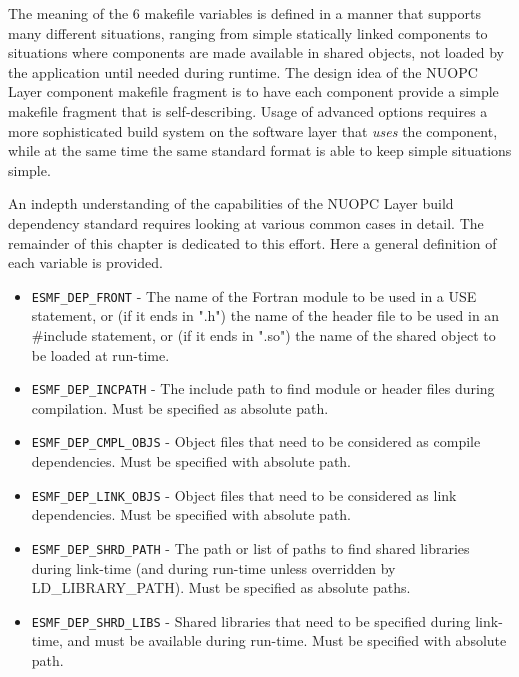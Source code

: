 The meaning of the 6 makefile variables is defined in a manner that supports many different situations, ranging from simple statically linked components to situations where components are made available in shared objects, not loaded by the application until needed during runtime. The design idea of the NUOPC Layer component makefile fragment is to have each component provide a simple makefile fragment that is self-describing. Usage of advanced options requires a more sophisticated build system on the software layer that {\em uses} the component, while at the same time the same standard format is able to keep simple situations simple.

An indepth understanding of the capabilities of the NUOPC Layer build dependency standard requires looking at various common cases in detail. The remainder of this chapter is dedicated to this effort. Here a general definition of each variable is provided.

\begin{itemize}

\item {\tt ESMF\_DEP\_FRONT} - The name of the Fortran module to be used in a USE statement, or (if it ends in ".h") the name of the header file to be used in an \#include statement, or (if it ends in ".so") the name of the shared object to be loaded at run-time.

\item {\tt ESMF\_DEP\_INCPATH} - The include path to find module or header files during compilation. Must be specified as absolute path.

\item {\tt ESMF\_DEP\_CMPL\_OBJS} - Object files that need to be considered as compile dependencies. Must be specified with absolute path.

\item {\tt ESMF\_DEP\_LINK\_OBJS} - Object files that need to be considered as link dependencies. Must be specified with absolute path.

\item {\tt ESMF\_DEP\_SHRD\_PATH} - The path or list of paths to find shared libraries during link-time (and during run-time unless overridden by LD\_LIBRARY\_PATH). Must be specified as absolute paths.

\item {\tt ESMF\_DEP\_SHRD\_LIBS} - Shared libraries that need to be specified during link-time, and must be available during run-time. Must be specified with absolute path.

\end{itemize}

